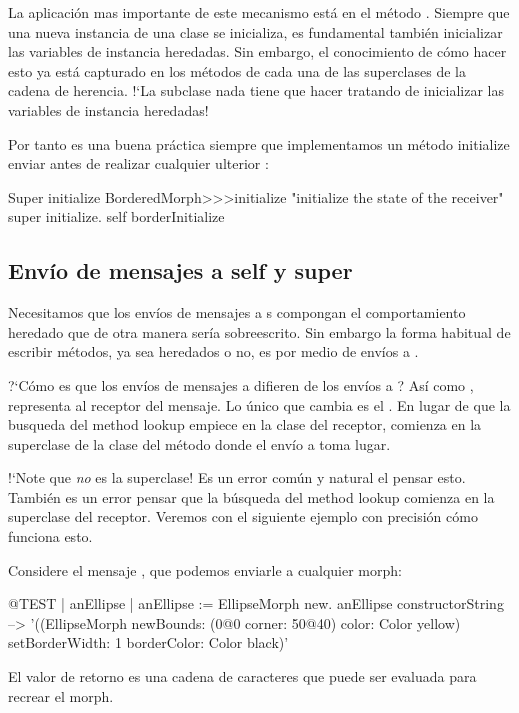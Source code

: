 \documentclass[a4paper,10pt,twoside]{book}
\begin{document}
La aplicaci\'on mas importante de este mecanismo est\'a en el m\'etodo .
Siempre que una nueva instancia de una clase se inicializa, es fundamental tambi\'en inicializar las variables de instancia heredadas.
Sin embargo, el conocimiento de c\'omo hacer esto ya est\'a capturado en los m\'etodos  de cada una de las superclases de la cadena de herencia.
!`La subclase nada tiene que hacer tratando de inicializar las variables de instancia heredadas!

Por tanto es una buena pr\'actica siempre que implementamos un m\'etodo initialize enviar  antes de realizar cualquier ulterior :

\begin{method}[morphinit]{Super initialize}
BorderedMorph>>>initialize
	"initialize the state of the receiver"
	super initialize.
	self borderInitialize
\end{method}


\subsection{Env\'io de mensajes a self y super}

Necesitamos que los env\'ios de mensajes a \super {}s compongan el comportamiento heredado que de otra manera ser\'ia sobreescrito.
Sin embargo la forma habitual de escribir m\'etodos, ya sea heredados o no, es por medio de env\'ios a \self {}.

?`C\'omo es que los env\'ios de mensajes a \self difieren de los env\'ios a \super ?
As\'i como \self, \super representa al receptor del mensaje.
Lo \'unico que cambia es el .
En lugar de que la busqueda del method lookup empiece en la clase del receptor, comienza en la superclase de la clase del m\'etodo donde el env\'io a \super toma lugar.

!`Note que \super \emph{no} es la superclase!
Es un error com\'un y natural el pensar esto.
Tambi\'en es un error pensar que la b\'usqueda del method lookup comienza en la superclase del receptor.
Veremos con el siguiente ejemplo con precisi\'on c\'omo funciona esto.

Considere el mensaje , que podemos enviarle a cualquier morph:
\begin{code}{@TEST | anEllipse | anEllipse := EllipseMorph new.}
anEllipse constructorString --> '((EllipseMorph newBounds: (0@0 corner: 50@40) color: Color yellow) setBorderWidth: 1 borderColor: Color black)'
\end{code}
El valor de retorno es una cadena de caracteres que puede ser evaluada para recrear el morph.
\end{document}
